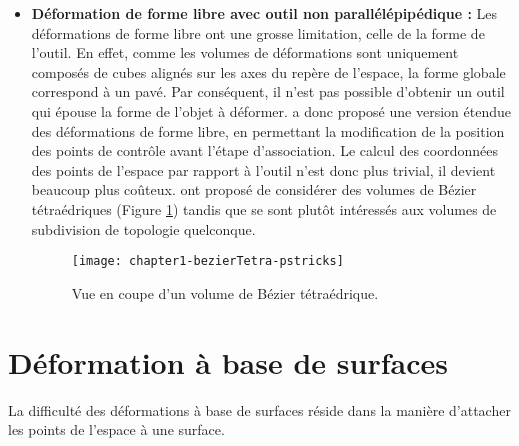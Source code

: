 \begin{itemize}
\item{\textbf{Déformation de forme libre avec outil non parallélépipédique :}}
Les déformations de forme libre ont une grosse limitation, celle de la forme
de l'outil. En effet, comme les volumes de déformations sont uniquement
composés de cubes alignés sur les axes du repère de l'espace, la forme globale
correspond à un pavé. Par conséquent, il n'est pas possible d'obtenir un outil
qui épouse la forme de l'objet à déformer. \cite{Coq90} a donc proposé une
version étendue des déformations de forme libre, en permettant la modification
de la position des points de contrôle avant l'étape d'association. Le calcul
des coordonnées des points de l'espace par rapport à l'outil n'est donc plus
trivial, il devient beaucoup plus coûteux. \cite{BBT97} ont proposé de
considérer des volumes de Bézier tétraédriques (Figure \ref{SURTet}) tandis
que \cite{MJ96} se sont plutôt intéressés aux volumes de subdivision de
topologie quelconque.

\begin{figure}[ht]
\begin{center}
	\texttt{[image: chapter1-bezierTetra-pstricks]}
  \caption[Volume de Bézier tétraédrique] {Vue en coupe d'un volume de
  Bézier tétraédrique.}
  \label{SURTet}
\end{center}
\end{figure}

\end{itemize}

\section{Déformation à base de surfaces} 

La difficulté des déformations à base de surfaces réside dans la manière
d'attacher les points de l'espace à une surface.

